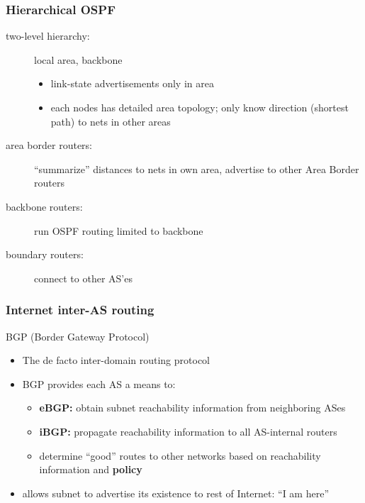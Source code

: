 \subsubsection{Hierarchical OSPF}
\begin{description}
	\item[two-level hierarchy:] local area, backbone
	\begin{itemize}
		\item link-state advertisements only in area
		\item each nodes has detailed area topology; only know direction (shortest path) to nets in other areas
	\end{itemize}
	\item[area border routers:] ``summarize'' distances to nets in own area, advertise to other Area Border routers
	\item[backbone routers:] run OSPF routing limited to backbone
	\item[boundary routers:] connect to other AS'es
\end{description}
\subsubsection{Internet inter-AS routing}
\begin{note}{BGP (Border Gateway Protocol)}
	\begin{itemize}
		\item The de facto inter-domain routing protocol
		\item BGP provides each AS a means to:
		\begin{itemize}
			\item \textbf{eBGP:} obtain subnet reachability information from neighboring ASes
			\item \textbf{iBGP:} propagate reachability information to all AS-internal routers
			\item determine ``good'' routes to other networks based on reachability information and \textbf{policy}
		\end{itemize}
		\item allows subnet to advertise its existence to rest of Internet: ``I am here''
	\end{itemize}
\end{note}\label{note:bgp}

